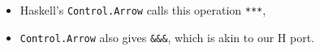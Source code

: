\documentclass[10pt]{beamer}
\begin{document}
\begin{frame}
\begin{center}
  \end{center}

  \begin{itemize}
  \item Haskell's \lstinline{Control.Arrow} calls this operation
    \alert{\lstinline{***}},
  \item \lstinline{Control.Arrow} also gives \alert{\lstinline{&&&}},
    which is akin to our \alert{H} port.
  \end{itemize}
\end{frame}

\end{document}

